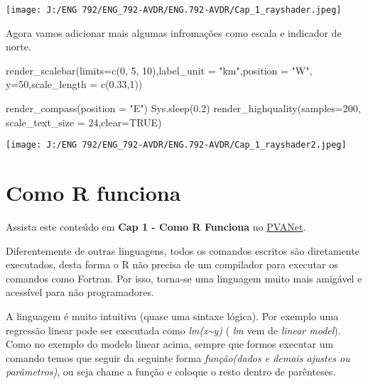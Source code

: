 \documentclass[
]{book}
\newenvironment{Shaded}{\begin{snugshade}}{\end{snugshade}}
\newcommand{\AttributeTok}[1]{\textcolor[rgb]{0.77,0.63,0.00}{#1}}
\newcommand{\ConstantTok}[1]{\textcolor[rgb]{0.00,0.00,0.00}{#1}}
\newcommand{\DecValTok}[1]{\textcolor[rgb]{0.00,0.00,0.81}{#1}}
\newcommand{\FloatTok}[1]{\textcolor[rgb]{0.00,0.00,0.81}{#1}}
\newcommand{\FunctionTok}[1]{\textcolor[rgb]{0.00,0.00,0.00}{#1}}
\newcommand{\NormalTok}[1]{#1}
\newcommand{\StringTok}[1]{\textcolor[rgb]{0.31,0.60,0.02}{#1}}
\begin{document}
\texttt{[image: J:/ENG 792/ENG\_792-AVDR/ENG.792-AVDR/Cap\_1\_rayshader.jpeg]}

Agora vamos adicionar mais algumas infromações como escala e indicador de norte.

\begin{Shaded}
\begin{Highlighting}[]
\FunctionTok{render\_scalebar}\NormalTok{(}\AttributeTok{limits=}\FunctionTok{c}\NormalTok{(}\DecValTok{0}\NormalTok{, }\DecValTok{5}\NormalTok{, }\DecValTok{10}\NormalTok{),}\AttributeTok{label\_unit =} \StringTok{"km"}\NormalTok{,}\AttributeTok{position =} \StringTok{"W"}\NormalTok{, }\AttributeTok{y=}\DecValTok{50}\NormalTok{,}\AttributeTok{scale\_length =} \FunctionTok{c}\NormalTok{(}\FloatTok{0.33}\NormalTok{,}\DecValTok{1}\NormalTok{))}

\FunctionTok{render\_compass}\NormalTok{(}\AttributeTok{position =} \StringTok{"E"}\NormalTok{)}
\FunctionTok{Sys.sleep}\NormalTok{(}\FloatTok{0.2}\NormalTok{)}
\FunctionTok{render\_highquality}\NormalTok{(}\AttributeTok{samples=}\DecValTok{200}\NormalTok{, }\AttributeTok{scale\_text\_size =} \DecValTok{24}\NormalTok{,}\AttributeTok{clear=}\ConstantTok{TRUE}\NormalTok{)}
\end{Highlighting}
\end{Shaded}

\texttt{[image: J:/ENG 792/ENG\_792-AVDR/ENG.792-AVDR/Cap\_1\_rayshader2.jpeg]}

\hypertarget{como-r-funciona}{%
\section{Como R funciona}\label{como-r-funciona}}

Assista este conteúdo em \textbf{Cap 1 - Como R Funciona} no \href{https://www2.cead.ufv.br/sistemas/pvanet/geral/login.php}{PVANet}.

Diferentemente de outras linguagens, todos os comandos escritos são diretamente executados, desta forma o R não precisa de um compilador para executar os comandos como Fortran. Por isso, torna-se uma linguagem muito mais amigável e acessível para não programadores.

A linguagem é muito intuitiva (quase uma sintaxe lógica). Por exemplo uma regressão linear pode ser executada como \emph{lm(x\textasciitilde y)} ( \emph{\emph{lm}} vem de \emph{\emph{linear model}}). Como no exemplo do modelo linear acima, sempre que formos executar um comando temos que seguir da seguinte forma \emph{\emph{função(dados e demais ajustes ou parâmetros)}}, ou seja chame a função e coloque o resto dentro de parênteses.
\end{document}
